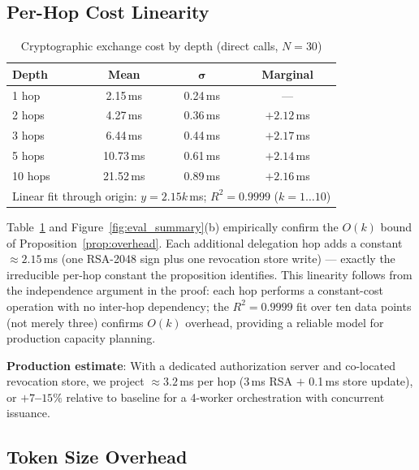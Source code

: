 \documentclass[journal]{IEEEtran}
\begin{document}
\subsection{Per-Hop Cost Linearity}

\begin{table}[h]
\caption{Cryptographic exchange cost by depth (direct calls, $N=30$)}
\label{tab:hopcosts}
\centering
\footnotesize
\begin{tabular}{lccc}
\toprule
\textbf{Depth} & \textbf{Mean} & $\boldsymbol\sigma$ & \textbf{Marginal} \\
\midrule
1 hop  &  2.15\,ms & 0.24\,ms & ---        \\
2 hops &  4.27\,ms & 0.36\,ms & $+2.12$\,ms \\
3 hops &  6.44\,ms & 0.44\,ms & $+2.17$\,ms \\
5 hops & 10.73\,ms & 0.61\,ms & $+2.14$\,ms \\
10 hops & 21.52\,ms & 0.89\,ms & $+2.16$\,ms \\
\midrule
\multicolumn{4}{l}{\scriptsize
  Linear fit through origin: $y = 2.15k$\,ms;\; $R^2 = 0.9999$ ($k=1\ldots10$)}
\end{tabular}
\end{table}

Table~\ref{tab:hopcosts} and Figure~\ref{fig:eval_summary}(b) empirically
confirm the $O(k)$ bound of Proposition~\ref{prop:overhead}.
Each additional delegation hop adds a constant $\approx 2.15$\,ms (one RSA-2048 sign plus one revocation store
write) --- exactly the irreducible per-hop constant the proposition
identifies. This linearity follows from the independence argument in the
proof: each hop performs a constant-cost operation with no
inter-hop dependency; the $R^2 = 0.9999$ fit over ten data points (not merely
three) confirms $O(k)$ overhead, providing a reliable model for production
capacity planning.

\textbf{Production estimate}: With a dedicated authorization server and
co-located revocation store, we project $\approx 3.2$\,ms per hop (3\,ms RSA
$+$ 0.1\,ms store update), or \textbf{$+7$--$15\%$} relative to baseline for
a 4-worker orchestration with concurrent issuance.

\subsection{Token Size Overhead}
\end{document}
